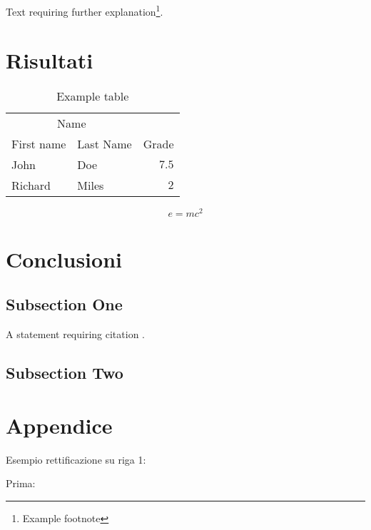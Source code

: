 \documentclass[twoside,twocolumn]{article}
\begin{document}
Text requiring further explanation\footnote{Example footnote}.


\section{Risultati}

\begin{table}
\caption{Example table}
\centering
\begin{tabular}{llr}
\toprule
\multicolumn{2}{c}{Name} \\
\cmidrule(r){1-2}
First name & Last Name & Grade \\
\midrule
John & Doe & $7.5$ \\
Richard & Miles & $2$ \\
\bottomrule
\end{tabular}
\end{table}

\blindtext %

\begin{equation}
\label{eq:emc}
e = mc^2
\end{equation}

\blindtext %


\section{Conclusioni}

\subsection{Subsection One}

A statement requiring citation \cite{XieKang:2003}.
\blindtext %

\subsection{Subsection Two}

\blindtext %


\section{Appendice}

Esempio rettificazione su riga 1:

Prima: 
\end{document}
